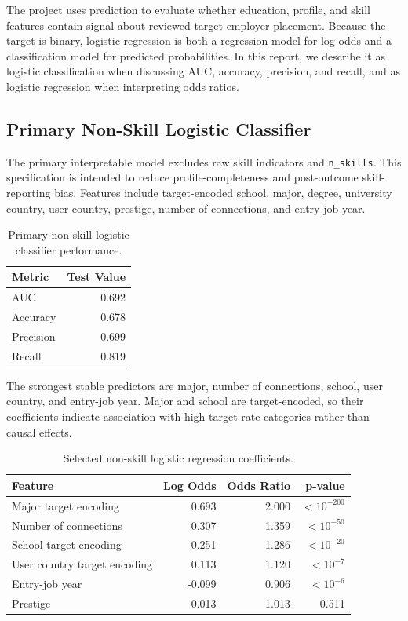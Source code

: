 \documentclass[11pt]{article}
\begin{document}
The project uses prediction to evaluate whether education, profile, and skill features contain signal about reviewed target-employer placement. Because the target is binary, logistic regression is both a regression model for log-odds and a classification model for predicted probabilities. In this report, we describe it as logistic classification when discussing AUC, accuracy, precision, and recall, and as logistic regression when interpreting odds ratios.

\subsection{Primary Non-Skill Logistic Classifier}

The primary interpretable model excludes raw skill indicators and \texttt{n\_skills}. This specification is intended to reduce profile-completeness and post-outcome skill-reporting bias. Features include target-encoded school, major, degree, university country, user country, prestige, number of connections, and entry-job year.

\begin{table}[H]
\centering
\caption{Primary non-skill logistic classifier performance.}
\label{tab:nonskill}
\begin{tabular}{lr}
\toprule
Metric & Test Value \\
\midrule
AUC & 0.692 \\
Accuracy & 0.678 \\
Precision & 0.699 \\
Recall & 0.819 \\
\bottomrule
\end{tabular}
\end{table}

The strongest stable predictors are major, number of connections, school, user country, and entry-job year. Major and school are target-encoded, so their coefficients indicate association with high-target-rate categories rather than causal effects.

\begin{table}[H]
\centering
\caption{Selected non-skill logistic regression coefficients.}
\label{tab:coefficients}
\begin{tabular}{lrrr}
\toprule
Feature & Log Odds & Odds Ratio & p-value \\
\midrule
Major target encoding & 0.693 & 2.000 & $<10^{-200}$ \\
Number of connections & 0.307 & 1.359 & $<10^{-50}$ \\
School target encoding & 0.251 & 1.286 & $<10^{-20}$ \\
User country target encoding & 0.113 & 1.120 & $<10^{-7}$ \\
Entry-job year & -0.099 & 0.906 & $<10^{-6}$ \\
Prestige & 0.013 & 1.013 & 0.511 \\
\bottomrule
\end{tabular}
\end{table}
\end{document}
